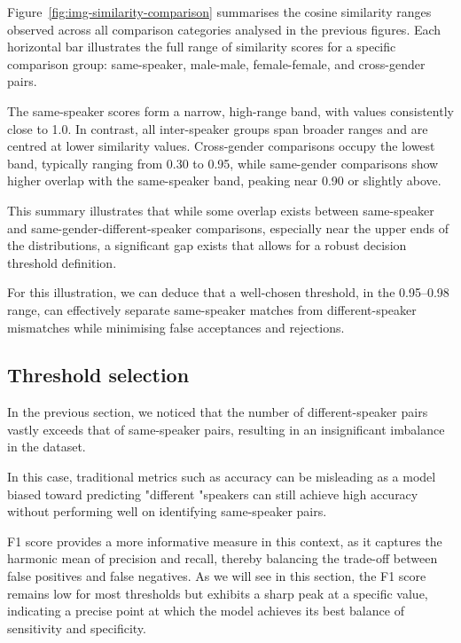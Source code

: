 \documentclass[conference]{IEEEtran}
\begin{document}
	Figure~\ref{fig:img-similarity-comparison} summarises the cosine similarity ranges observed across all comparison categories analysed in the previous figures. Each horizontal bar illustrates the full range of similarity scores for a specific comparison group: same-speaker, male-male, female-female, and cross-gender pairs.
	
	The same-speaker scores form a narrow, high-range band, with values consistently close to 1.0. In contrast, all inter-speaker groups span broader ranges and are centred at lower similarity values. Cross-gender comparisons occupy the lowest band, typically ranging from 0.30 to 0.95, while same-gender comparisons show higher overlap with the same-speaker band, peaking near 0.90 or slightly above.
	
	This summary illustrates that while some overlap exists between same-speaker and same-gender-different-speaker comparisons, especially near the upper ends of the distributions, a significant gap exists that allows for a robust decision threshold definition.
	
	For this illustration, we can deduce that a well-chosen threshold, in the 0.95–0.98 range, can effectively separate same-speaker matches from different-speaker mismatches while minimising false acceptances and rejections.
	
	\subsection{Threshold selection}
	
	In the previous section, we noticed that the number of different-speaker pairs vastly exceeds that of same-speaker pairs, resulting in an insignificant imbalance in the dataset.
	
	In this case, traditional metrics such as accuracy can be misleading as a model biased toward predicting "different "speakers can still achieve high accuracy without performing well on identifying same-speaker pairs. 
	
	F1 score provides a more informative measure in this context,  as it captures the harmonic mean of precision and recall, thereby balancing the trade-off between false positives and false negatives. As we will see in this section, the F1 score remains low for most thresholds but exhibits a sharp peak at a specific value, indicating a precise point at which the model achieves its best balance of sensitivity and specificity. 
	
\end{document}

